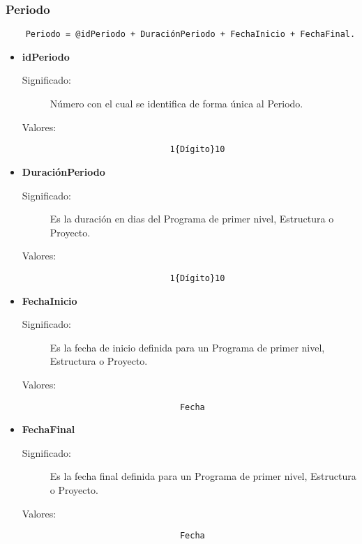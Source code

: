 \subsubsection{Periodo}
\label{Periodo}
\begin{lstlisting}
	Periodo = @idPeriodo + DuraciónPeriodo + FechaInicio + FechaFinal.
\end{lstlisting}
\begin{itemize}
	\item	\textbf{idPeriodo}
		\begin{description}
			\item [Significado:] Número con el cual se identifica de forma única al Periodo.
			\item [Valores:]{\begin{lstlisting}
					    1{Dígito}10
					 \end{lstlisting}}
		\end{description}
	\item	\textbf{DuraciónPeriodo}
		\begin{description}
			\item [Significado:] Es la duración en dias del Programa de primer nivel, Estructura o Proyecto.
			\item [Valores:]{\begin{lstlisting}
					    1{Dígito}10
					 \end{lstlisting}}
		\end{description}
      \item	\textbf{FechaInicio}
		\begin{description}
			\item [Significado:] Es la fecha de inicio definida para un Programa de primer nivel, Estructura o Proyecto.
			\item [Valores:]{ \begin{lstlisting} 
					      Fecha 
					  \end{lstlisting}}
		\end{description}
      \item	\textbf{FechaFinal}
		\begin{description}
			\item [Significado:] Es la fecha final definida para un Programa de primer nivel, Estructura o Proyecto.
			\item [Valores:]{ \begin{lstlisting} 
					      Fecha 
					  \end{lstlisting}}
		\end{description}
\end{itemize}





